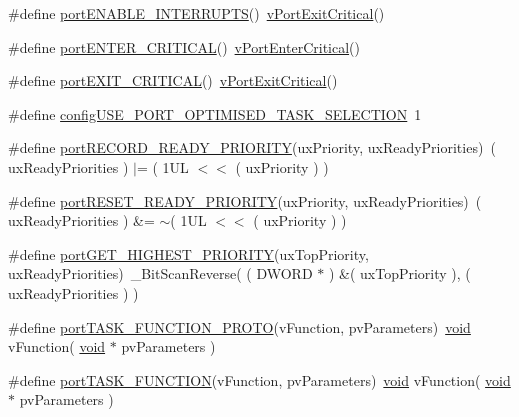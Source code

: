 \begin{DoxyCompactItemize}
\item 
\#define \hyperlink{MSVC-MingW_2portmacro_8h_abc47e85a6befbb47961ad5ee7aa57173}{port\-E\-N\-A\-B\-L\-E\-\_\-\-I\-N\-T\-E\-R\-R\-U\-P\-T\-S}()~\hyperlink{Tasking_2ARM__CM4F_2portmacro_8h_aed20ada05b957181a0de042802a82a5b}{v\-Port\-Exit\-Critical}()
\item 
\#define \hyperlink{MSVC-MingW_2portmacro_8h_a8a09321ad004019f3c8d0f2e4d7224c7}{port\-E\-N\-T\-E\-R\-\_\-\-C\-R\-I\-T\-I\-C\-A\-L}()~\hyperlink{Tasking_2ARM__CM4F_2portmacro_8h_a2ed3554a3de09a3bd09d396ee081ab69}{v\-Port\-Enter\-Critical}()
\item 
\#define \hyperlink{MSVC-MingW_2portmacro_8h_a529358e6147881dd881c890ade21c9bd}{port\-E\-X\-I\-T\-\_\-\-C\-R\-I\-T\-I\-C\-A\-L}()~\hyperlink{Tasking_2ARM__CM4F_2portmacro_8h_aed20ada05b957181a0de042802a82a5b}{v\-Port\-Exit\-Critical}()
\item 
\#define \hyperlink{MSVC-MingW_2portmacro_8h_aebb8c3a87d591f60f974772be0ee798d}{config\-U\-S\-E\-\_\-\-P\-O\-R\-T\-\_\-\-O\-P\-T\-I\-M\-I\-S\-E\-D\-\_\-\-T\-A\-S\-K\-\_\-\-S\-E\-L\-E\-C\-T\-I\-O\-N}~1
\item 
\#define \hyperlink{MSVC-MingW_2portmacro_8h_a113cd9b8401284194da8ddc4569aa484}{port\-R\-E\-C\-O\-R\-D\-\_\-\-R\-E\-A\-D\-Y\-\_\-\-P\-R\-I\-O\-R\-I\-T\-Y}(ux\-Priority, ux\-Ready\-Priorities)~( ux\-Ready\-Priorities ) $\vert$= ( 1\-U\-L $<$$<$ ( ux\-Priority ) )
\item 
\#define \hyperlink{MSVC-MingW_2portmacro_8h_aab771d12c0912d93d52a586628fb18a6}{port\-R\-E\-S\-E\-T\-\_\-\-R\-E\-A\-D\-Y\-\_\-\-P\-R\-I\-O\-R\-I\-T\-Y}(ux\-Priority, ux\-Ready\-Priorities)~( ux\-Ready\-Priorities ) \&= $\sim$( 1\-U\-L $<$$<$ ( ux\-Priority ) )
\item 
\#define \hyperlink{MSVC-MingW_2portmacro_8h_a5ed536be98084ed8c77c95d79a2688ee}{port\-G\-E\-T\-\_\-\-H\-I\-G\-H\-E\-S\-T\-\_\-\-P\-R\-I\-O\-R\-I\-T\-Y}(ux\-Top\-Priority, ux\-Ready\-Priorities)~\-\_\-\-Bit\-Scan\-Reverse( ( D\-W\-O\-R\-D $\ast$ ) \&( ux\-Top\-Priority ), ( ux\-Ready\-Priorities ) )
\item 
\#define \hyperlink{MSVC-MingW_2portmacro_8h_a2921e1c5a1f974dfa01ae44d1f665f14}{port\-T\-A\-S\-K\-\_\-\-F\-U\-N\-C\-T\-I\-O\-N\-\_\-\-P\-R\-O\-T\-O}(v\-Function, pv\-Parameters)~\hyperlink{Paradigm_2Tern__EE_2small_2portmacro_8h_a14d32f8130d3c0b212cfc751730b5b49}{void} v\-Function( \hyperlink{Paradigm_2Tern__EE_2small_2portmacro_8h_a14d32f8130d3c0b212cfc751730b5b49}{void} $\ast$ pv\-Parameters )
\item 
\#define \hyperlink{MSVC-MingW_2portmacro_8h_a3a289793652f505c538abea27045ccdf}{port\-T\-A\-S\-K\-\_\-\-F\-U\-N\-C\-T\-I\-O\-N}(v\-Function, pv\-Parameters)~\hyperlink{Paradigm_2Tern__EE_2small_2portmacro_8h_a14d32f8130d3c0b212cfc751730b5b49}{void} v\-Function( \hyperlink{Paradigm_2Tern__EE_2small_2portmacro_8h_a14d32f8130d3c0b212cfc751730b5b49}{void} $\ast$ pv\-Parameters )

\end{DoxyCompactItemize}
